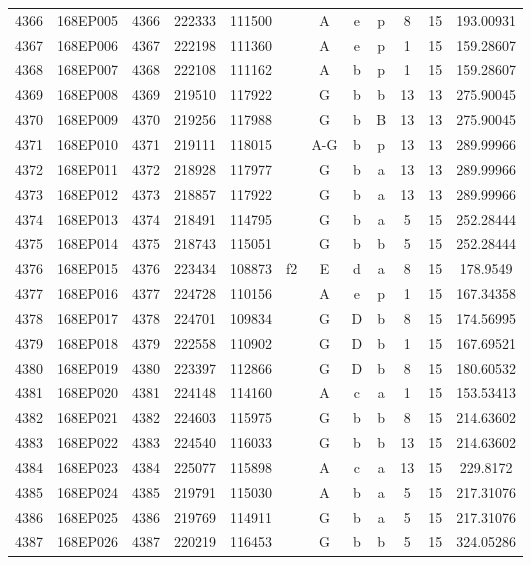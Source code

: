 \begin{tabular}{|*{12}{c|}}
4366 & 168EP005 & 4366 & 222333 & 111500 &  & A & e & p & 8 & 15 & 193.00931 \\ 
4367 & 168EP006 & 4367 & 222198 & 111360 &  & A & e & p & 1 & 15 & 159.28607 \\ 
4368 & 168EP007 & 4368 & 222108 & 111162 &  & A & b & p & 1 & 15 & 159.28607 \\ 
4369 & 168EP008 & 4369 & 219510 & 117922 &  & G & b & b & 13 & 13 & 275.90045 \\ 
4370 & 168EP009 & 4370 & 219256 & 117988 &  & G & b & B & 13 & 13 & 275.90045 \\ 
4371 & 168EP010 & 4371 & 219111 & 118015 &  & A-G & b & p & 13 & 13 & 289.99966 \\ 
4372 & 168EP011 & 4372 & 218928 & 117977 &  & G & b & a & 13 & 13 & 289.99966 \\ 
4373 & 168EP012 & 4373 & 218857 & 117922 &  & G & b & a & 13 & 13 & 289.99966 \\ 
4374 & 168EP013 & 4374 & 218491 & 114795 &  & G & b & a & 5 & 15 & 252.28444 \\ 
4375 & 168EP014 & 4375 & 218743 & 115051 &  & G & b & b & 5 & 15 & 252.28444 \\ 
4376 & 168EP015 & 4376 & 223434 & 108873 & f2 & E & d & a & 8 & 15 & 178.9549 \\ 
4377 & 168EP016 & 4377 & 224728 & 110156 &  & A & e & p & 1 & 15 & 167.34358 \\ 
4378 & 168EP017 & 4378 & 224701 & 109834 &  & G & D & b & 8 & 15 & 174.56995 \\ 
4379 & 168EP018 & 4379 & 222558 & 110902 &  & G & D & b & 1 & 15 & 167.69521 \\ 
4380 & 168EP019 & 4380 & 223397 & 112866 &  & G & D & b & 8 & 15 & 180.60532 \\ 
4381 & 168EP020 & 4381 & 224148 & 114160 &  & A & c & a & 1 & 15 & 153.53413 \\ 
4382 & 168EP021 & 4382 & 224603 & 115975 &  & G & b & b & 8 & 15 & 214.63602 \\ 
4383 & 168EP022 & 4383 & 224540 & 116033 &  & G & b & b & 13 & 15 & 214.63602 \\ 
4384 & 168EP023 & 4384 & 225077 & 115898 &  & A & c & a & 13 & 15 & 229.8172 \\ 
4385 & 168EP024 & 4385 & 219791 & 115030 &  & A & b & a & 5 & 15 & 217.31076 \\ 
4386 & 168EP025 & 4386 & 219769 & 114911 &  & G & b & a & 5 & 15 & 217.31076 \\ 
4387 & 168EP026 & 4387 & 220219 & 116453 &  & G & b & b & 5 & 15 & 324.05286 \\ 

\end{tabular}
